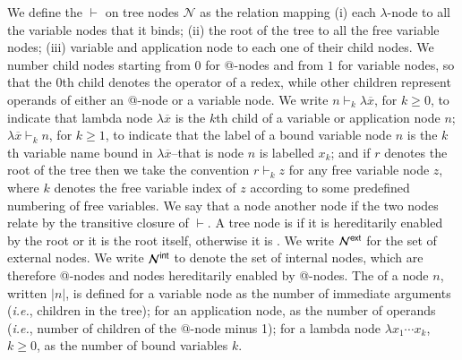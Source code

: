 \documentclass{elsarticle}
\makeatletter
\theoremstyle{plain}
\theoremstyle{definition}
\newcommand\Nodes{\mathcal{N}}%
\newcommand{\enables}{\vdash} %
\newcommand{\ExternalNodes}{\Nodes^{\sf ext}}
\newcommand{\InternalNodes}{\Nodes^{\sf int}}
\renewcommand\ie{{\it i.e.\@\xspace}}
\makeatother
\begin{document}
We define the  $\enables$ on tree nodes $\Nodes$ as the relation mapping (i) each $\lambda$-node to all the variable nodes that it binds; (ii) the root of the tree to all the free variable nodes; (iii) variable and application node to each one of their child nodes.
We number child nodes starting from $0$ for @-nodes and from $1$ for variable nodes, so that the $0$th child denotes the operator of a redex, while other children represent operands of either an @-node or a variable node.
%
We write
$n \enables_k \lambda\overline{x}$, for $k\geq0$, to indicate that
lambda node $\lambda\overline{x}$ is the $k$th child of a variable or application node $n$;
$\lambda\overline{x} \enables_k n$, for $k\geq1$, to indicate that the label of a bound variable node $n$ is the $k$th variable name bound in $\lambda\overline{x}$--that is node $n$ is labelled $x_k$;
 and if $r$ denotes the root of the tree then we take the convention $r \enables_k z$ for any free variable node $z$, where $k$ denotes the free variable index of $z$ according to some predefined numbering of free variables.
%
We say that a node  another node if the two nodes relate by the transitive closure of $\enables$.
%
A tree node is  if it is hereditarily enabled by the root or it is the root itself, otherwise it is . We write $\ExternalNodes$ for the set of external nodes.
We write $\InternalNodes$ to denote the set of internal nodes, which are therefore @-nodes and nodes hereditarily enabled by @-nodes.
The  of a node $n$, written $|n|$,
is defined for a variable node as the number of immediate arguments (\ie, children in the tree); for an application node, as the number of operands (\ie, number of children of the $@$-node minus 1); for a lambda node $\lambda x_1 \cdots x_k$, $k\geq 0$, as the number of bound variables $k$.
\end{document}
